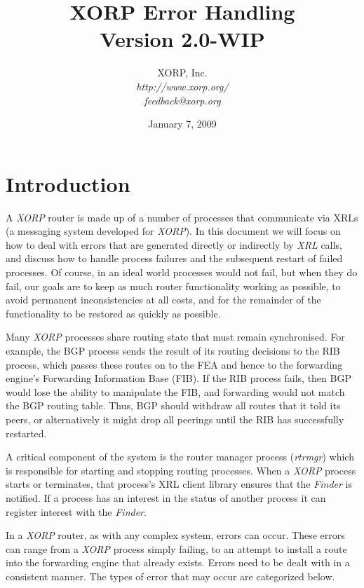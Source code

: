 \documentclass[11pt]{article}
\makeatletter
\newcommand{\xorp} {{\em XORP}\@\xspace}
\newcommand{\finder} {{\em Finder}\@\xspace}
\newcommand{\xrl} {{\em XRL}\@\xspace}
\newcommand{\rtrmgr} {{\em rtrmgr}\@\xspace}
\makeatother
\begin{document}
\title{XORP Error Handling \\
\vspace{1ex}
Version 2.0-WIP}
\author{ XORP, Inc.					\\
         {\it http://www.xorp.org/}			\\
	 {\it feedback@xorp.org}
}
\date{January 7, 2009}

\maketitle


\section{Introduction}

A \xorp router is made up of a number of processes that communicate
via XRLs \cite{xorp:xrl} (a messaging system developed for \xorp). In
this document we will focus on how to deal with errors that are
generated directly or indirectly by \xrl calls, and discuss how to
handle process failures and the subsequent restart of failed
processes.  Of course, in an ideal world processes would not fail, but
when they do fail, our goals are to keep as much router
functionality working as possible, to avoid permanent inconsistencies
at all costs, and for the remainder of the functionality to be
restored as quickly as possible.

Many \xorp processes share routing state that must remain
synchronised. For example, the BGP process sends the result of its
routing decisions to the RIB process, which passes these routes on to
the FEA and hence to the forwarding engine's Forwarding Information
Base (FIB). If the RIB process fails, then BGP would lose the ability
to manipulate the FIB, and forwarding would not match the BGP routing
table.  Thus, BGP should withdraw all routes that it told its peers, or
alternatively it might drop all peerings until the RIB has
successfully restarted.

A critical component of the system is the router manager process
(\rtrmgr) which is responsible for starting and stopping routing
processes. When a \xorp process starts or terminates, that
process's XRL client library ensures that the \finder is notified. If
a process has an interest in the status of another process it can
register interest with the \finder.

In a \xorp router, as with any complex system, errors can occur. These
errors can range from a \xorp process simply failing, to an attempt to
install a route into the forwarding engine that already exists. Errors
need to be dealt with in a consistent manner. The types
of error that may occur are categorized below.
\end{document}
